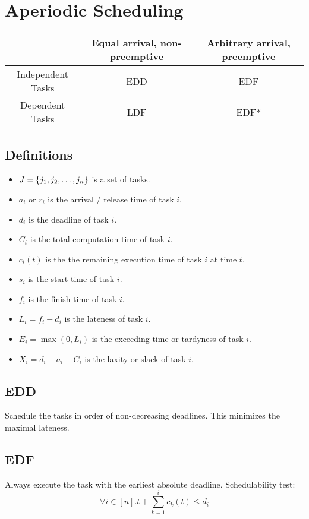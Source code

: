 \section{Aperiodic Scheduling}
\begin{center}
	{\renewcommand{\arraystretch}{2}
	\begin{tabular}{|c|c|c|}
		\hline
							& Equal arrival, non-preemptive	& Arbitrary arrival, preemptive \tabularnewline\hline
		Independent Tasks	& EDD							& EDF							\tabularnewline\hline
		Dependent Tasks		& LDF							& EDF*							\tabularnewline\hline
	\end{tabular}}
\end{center}

\subsection{Definitions}
\begin{itemize}
	\item $J = \left\lbrace j_1, j_2, \dots, j_n \right\rbrace$ is a set of tasks.
	\item $a_i$ or $r_i$ is the arrival / release time of task $i$.
	\item $d_i$ is the deadline of task $i$.
	\item $C_i$ is the total computation time of task $i$.
	\item $c_i(t)$ is the the remaining execution time of task $i$ at time $t$.
	\item $s_i$ is the start time of task $i$.
	\item $f_i$ is the finish time of task $i$.
	\item $L_i = f_i - d_i$ is the lateness of task $i$.
	\item $E_i = \max\left(0, L_i\right)$ is the exceeding time or tardyness of task $i$.
	\item $X_i = d_i - a_i - C_i$ is the laxity or slack of task $i$.
\end{itemize}

\subsection{EDD}
Schedule the tasks in order of non-decreasing deadlines. This minimizes the
maximal lateness.

\subsection{EDF}
Always execute the task with the earliest absolute deadline.
Schedulability test:
\begin{equation*}
	\forall i \in [n] . t + \sum_{k = 1}^{i} c_k(t) \leq d_i
\end{equation*}

